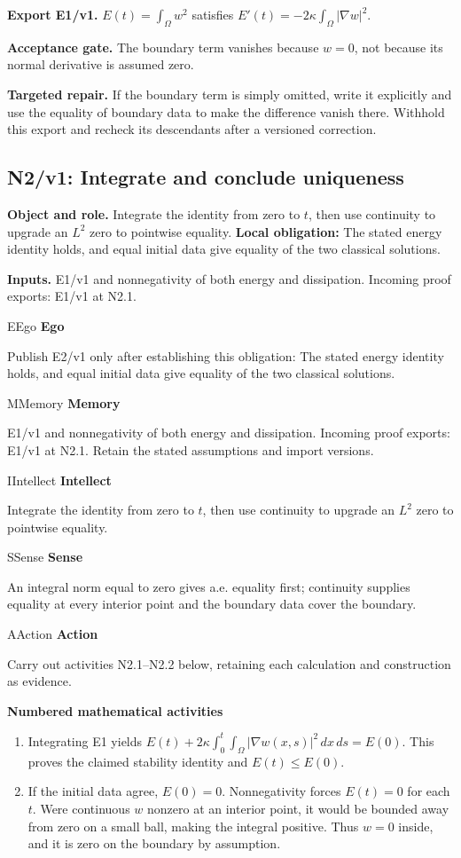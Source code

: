 \documentclass[preprint,12pt,aps,pra,showkeys,amsmath,amssymb,superscriptaddress,floatfix]{revtex4-2}
\theoremstyle{definition}
\theoremstyle{remark}
\newcommand{\mmfaculty}[3]{%
 \begin{mmfacultybox}{#1}{#2}
 {\sffamily\bfseries\color{MMBlue}#2}\par\smallskip #3
 \end{mmfacultybox}}
\newcommand{\field}[2]{\par\smallskip\noindent\textbf{#1.} #2\par}
\begin{document}
\field{Export E1/v1}{\(E(t)=\int_\Omega w^2\) satisfies
\(E'(t)=-2\kappa\int_\Omega|\nabla w|^2\).}

\field{Acceptance gate}{The boundary term vanishes because \(w=0\), not because its normal
derivative is assumed zero.}

\field{Targeted repair}{If the boundary term is simply omitted, write it explicitly and use the
equality of boundary data to make the difference vanish there. Withhold
this export and recheck its descendants after a versioned correction.}

\clearpage

\subsection{N2/v1: Integrate and conclude uniqueness}

\field{Object and role}{Integrate the identity from zero to \(t\), then use continuity to
upgrade an \(L^2\) zero to pointwise equality. \textbf{Local
obligation:} The stated energy identity holds, and equal initial data
give equality of the two classical solutions.}

\field{Inputs}{E1/v1 and nonnegativity of both energy and dissipation. Incoming proof
exports: E1/v1 at N2.1.}

\mmfaculty{E}{Ego}{Publish E2/v1 only after establishing this obligation: The stated energy
identity holds, and equal initial data give equality of the two
classical solutions.}

\mmfaculty{M}{Memory}{E1/v1 and nonnegativity of both energy and dissipation. Incoming proof
exports: E1/v1 at N2.1. Retain the stated assumptions and import
versions.}

\mmfaculty{I}{Intellect}{Integrate the identity from zero to \(t\), then use continuity to
upgrade an \(L^2\) zero to pointwise equality.}

\mmfaculty{S}{Sense}{An integral norm equal to zero gives a.e. equality first; continuity
supplies equality at every interior point and the boundary data cover
the boundary.}

\mmfaculty{A}{Action}{Carry out activities N2.1--N2.2 below, retaining each calculation and
construction as evidence.}

\smallskip\noindent\textbf{Numbered mathematical activities}

\begin{enumerate}[label=N2.\arabic*,leftmargin=3.4em]

\item Integrating E1 yields
\(E(t)+2\kappa\int_0^t\int_\Omega|\nabla w(x,s)|^2\,dx\,ds=E(0)\). This
proves the claimed stability identity and \(E(t)\le E(0)\).

\item If the initial data agree, \(E(0)=0\). Nonnegativity forces \(E(t)=0\)
for each \(t\). Were continuous \(w\) nonzero at an interior point, it
would be bounded away from zero on a small ball, making the integral
positive. Thus \(w=0\) inside, and it is zero on the boundary by
assumption.

\end{enumerate}
\end{document}
